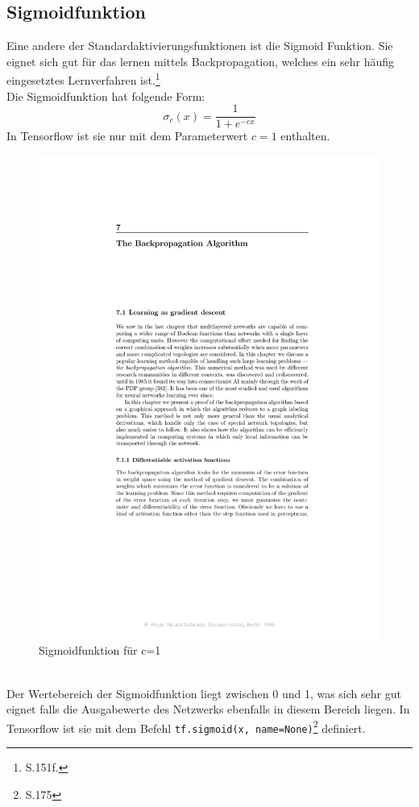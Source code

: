 \subsection{Sigmoidfunktion}
Eine andere der Standardaktivierungsfunktionen ist die Sigmoid Funktion. Sie eignet sich gut f\"ur das lernen mittels Backpropagation, welches ein sehr h\"aufig eingesetztes Lernverfahren ist.\footnote{\cite{Rojas1996} S.151f.}\\
Die Sigmoidfunktion hat folgende Form:\cite{Rojas1996}
\begin{equation}
\sigma_c(x)=\frac{1}{1+e^{-cx}}
\end{equation}
In Tensorflow ist sie nur mit dem Parameterwert $c=1$ enthalten.
\begin{figure}[!htp]
	\centering
	\includegraphics[page=2,trim = 6cm 14.2cm 5cm 11cm,clip=true,scale=1.1]{images/BackPropRojas.pdf}
	\caption{Sigmoidfunktion f\"ur c=1 \cite{Rojas1996}}
\end{figure}\\
Der Wertebereich der Sigmoidfunktion liegt zwischen 0 und 1, was sich sehr gut eignet falls die Ausgabewerte des Netzwerks ebenfalls in diesem Bereich liegen. In Tensorflow ist sie mit dem Befehl \lstinline$tf.sigmoid(x, name=None)$\footnote{\cite{building}S.175}
definiert.
